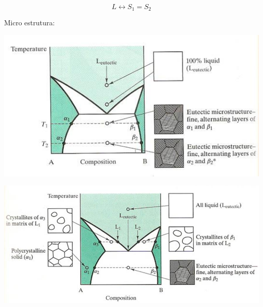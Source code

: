 \begin{equation}\label{key}
L \leftrightarrow S_{1} = S_{2}
\end{equation}

Micro estrutura:

\includegraphics[scale=0.4,trim={0 0 0 0}]{figures/microEute}

\includegraphics[scale=0.4,trim={0 0 0 0}]{figures/microEute2}



